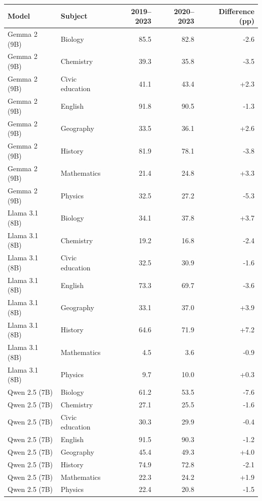 \begin{tabular}{@{}llrrr@{}}
\toprule
Model & Subject & 2019--2023 & 2020--2023 & Difference (pp) \\
\midrule
Gemma 2 (9B) & Biology & 85.5 & 82.8 & -2.6 \\
Gemma 2 (9B) & Chemistry & 39.3 & 35.8 & -3.5 \\
Gemma 2 (9B) & Civic education & 41.1 & 43.4 & +2.3 \\
Gemma 2 (9B) & English & 91.8 & 90.5 & -1.3 \\
Gemma 2 (9B) & Geography & 33.5 & 36.1 & +2.6 \\
Gemma 2 (9B) & History & 81.9 & 78.1 & -3.8 \\
Gemma 2 (9B) & Mathematics & 21.4 & 24.8 & +3.3 \\
Gemma 2 (9B) & Physics & 32.5 & 27.2 & -5.3 \\
Llama 3.1 (8B) & Biology & 34.1 & 37.8 & +3.7 \\
Llama 3.1 (8B) & Chemistry & 19.2 & 16.8 & -2.4 \\
Llama 3.1 (8B) & Civic education & 32.5 & 30.9 & -1.6 \\
Llama 3.1 (8B) & English & 73.3 & 69.7 & -3.6 \\
Llama 3.1 (8B) & Geography & 33.1 & 37.0 & +3.9 \\
Llama 3.1 (8B) & History & 64.6 & 71.9 & +7.2 \\
Llama 3.1 (8B) & Mathematics & 4.5 & 3.6 & -0.9 \\
Llama 3.1 (8B) & Physics & 9.7 & 10.0 & +0.3 \\
Qwen 2.5 (7B) & Biology & 61.2 & 53.5 & -7.6 \\
Qwen 2.5 (7B) & Chemistry & 27.1 & 25.5 & -1.6 \\
Qwen 2.5 (7B) & Civic education & 30.3 & 29.9 & -0.4 \\
Qwen 2.5 (7B) & English & 91.5 & 90.3 & -1.2 \\
Qwen 2.5 (7B) & Geography & 45.4 & 49.3 & +4.0 \\
Qwen 2.5 (7B) & History & 74.9 & 72.8 & -2.1 \\
Qwen 2.5 (7B) & Mathematics & 22.3 & 24.2 & +1.9 \\
Qwen 2.5 (7B) & Physics & 22.4 & 20.8 & -1.5 \\
\bottomrule
\end{tabular}
